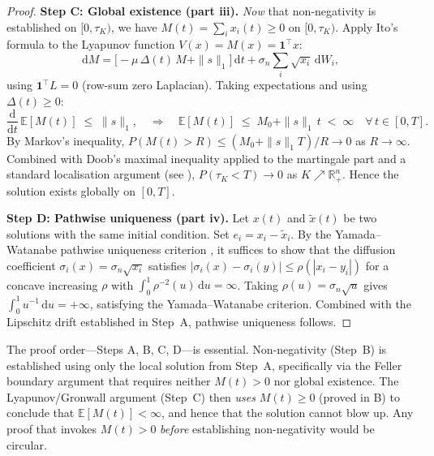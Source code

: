 \begin{proof}
\medskip
\noindent\textbf{Step C: Global existence (part iii).}
\emph{Now} that non-negativity is established on $[0,\tau_K)$, we have
$M(t)=\sum_i x_i(t)\ge 0$ on $[0,\tau_K)$.
Apply Ito's formula to the Lyapunov function $V(x)=M(x)=\mathbf{1}^\top x$:
\begin{equation}
  \mathrm{d}M = \bigl[-\mu\,\Delta(t)\,M + \|s\|_1\bigr]\,\mathrm{d}t
                + \sigma_n\sum_i\sqrt{x_i}\,\mathrm{d}W_i,
  \label{eq:dM_lyapunov}
\end{equation}
using $\mathbf{1}^\top L=0$ (row-sum zero Laplacian).
Taking expectations and using $\Delta(t)\ge 0$:
\begin{equation}
  \frac{\mathrm{d}}{\mathrm{d}t}\,\mathbb{E}[M(t)] \;\le\; \|s\|_1,
  \quad\Rightarrow\quad
  \mathbb{E}[M(t)] \;\le\; M_0 + \|s\|_1\,t \;<\; \infty \quad \forall\,t\in[0,T].
  \label{eq:EM_bound}
\end{equation}
By Markov's inequality, $P(M(t)>R)\le(M_0+\|s\|_1 T)/R\to 0$ as $R\to\infty$.
Combined with Doob's maximal inequality applied to the martingale part
and a standard localisation argument (see \cite[Thm.~5.2.1]{Oksendal2003}),
$P(\tau_K<T)\to 0$ as $K\nearrow\mathbb{R}^n_+$.
Hence the solution exists globally on $[0,T]$.

\medskip
\noindent\textbf{Step D: Pathwise uniqueness (part iv).}
Let $x(t)$ and $\tilde{x}(t)$ be two solutions with the same initial condition.
Set $e_i=x_i-\tilde{x}_i$.  By the Yamada--Watanabe pathwise uniqueness
criterion \cite{YamadaWatanabe1971}, it suffices to show that the diffusion
coefficient $\sigma_i(x)=\sigma_n\sqrt{x_i}$ satisfies
$|\sigma_i(x)-\sigma_i(y)|\le\rho(|x_i-y_i|)$ for a concave increasing
$\rho$ with $\int_0^1 \rho^{-2}(u)\,\mathrm{d}u=\infty$.
Taking $\rho(u)=\sigma_n\sqrt{u}$ gives $\int_0^1 u^{-1}\,\mathrm{d}u=+\infty$,
satisfying the Yamada--Watanabe criterion.
Combined with the Lipschitz drift established in Step~A, pathwise uniqueness follows.
\end{proof}

\begin{remark}
\label{rem:thm1_ordering}
The proof order---Steps A, B, C, D---is essential.  Non-negativity (Step~B) is
established using only the local solution from Step~A, specifically via the
Feller boundary argument that requires neither $M(t)>0$ nor global existence.
The Lyapunov/Gronwall argument (Step~C) then \emph{uses} $M(t)\ge 0$ (proved in B)
to conclude that $\mathbb{E}[M(t)]<\infty$, and hence that the solution cannot
blow up.  Any proof that invokes $M(t)>0$ \emph{before} establishing
non-negativity would be circular.
\end{remark}
